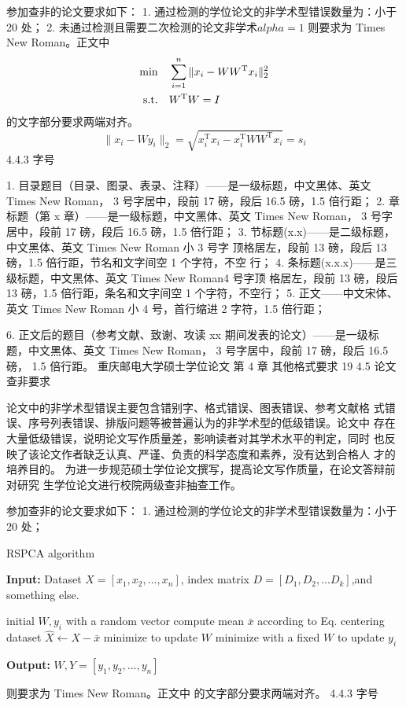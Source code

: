 \documentclass{CQUPTThesis}
\begin{document}
参加查非的论文要求如下：
1. 通过检测的学位论文的非学术型错误数量为：小于 20 处；
2. 未通过检测且需要二次检测的论文非学术$alpha=1$
则要求为 Times New Roman。正文中
\begin{align}
\min\quad&\sum_{i=1}^n\|x_i-WW^\mathrm{T}x_i\|_2^2\label{PCA}\\
\mbox{s.t.} \quad& W^\mathrm{T}W=I\notag
\end{align}
的文字部分要求两端对齐。
\begin{equation}
\|x_i-Wy_i\|_2=\sqrt{x_i^\mathrm{T}x_i-x_i^\mathrm{T}WW^\mathrm{T}x_i}=s_i
\end{equation}
4.4.3 字号

1. 目录题目（目录、图录、表录、注释）——是一级标题，中文黑体、英文
Times New Roman， 3 号字居中，段前 17 磅，段后 16.5 磅，1.5 倍行距；
2. 章标题（第 x 章）——是一级标题，中文黑体、英文 Times New Roman， 3
号字居中，段前 17 磅，段后 16.5 磅，1.5 倍行距；
3. 节标题(x.x)——是二级标题，中文黑体、英文 Times New Roman 小 3 号字
顶格居左，段前 13 磅，段后 13 磅，1.5 倍行距，节名和文字间空 1 个字符，不空
行；
4. 条标题(x.x.x)——是三级标题，中文黑体、英文 Times New Roman4 号字顶
格居左，段前 13 磅，段后 13 磅，1.5 倍行距，条名和文字间空 1 个字符，不空行；
5. 正文——中文宋体、英文 Times New Roman 小 4 号，首行缩进 2 字符，1.5
倍行距；


6. 正文后的题目（参考文献、致谢、攻读 xx 期间发表的论文）——是一级标
题，中文黑体、英文 Times New Roman， 3 号字居中，段前 17 磅，段后 16.5 磅，
1.5 倍行距。
重庆邮电大学硕士学位论文 第 4 章 其他格式要求
19
4.5 论文查非要求

论文中的非学术型错误主要包含错别字、格式错误、图表错误、参考文献格
式错误、序号列表错误、排版问题等被普遍认为的非学术型的低级错误。论文中
存在大量低级错误，说明论文写作质量差，影响读者对其学术水平的判定，同时
也反映了该论文作者缺乏认真、严谨、负责的科学态度和素养，没有达到合格人
才的培养目的。
为进一步规范硕士学位论文撰写，提高论文写作质量，在论文答辩前对研究
生学位论文进行校院两级查非抽查工作。

参加查非的论文要求如下：
1. 通过检测的学位论文的非学术型错误数量为：小于 20 处；
\begin{algorithm}
\linespread{1.0}\selectfont
\caption{RSPCA algorithm}
{\bf Input: }Dataset $X=[x_1,x_2,...,x_n]$, index matrix $D=[D_1,D_2,...D_k]$,and something else.
\label{alg1}
\begin{algorithmic}[1]
  \STATE initial $W,y_i$ with a random vector
  \STATE compute mean $\bar x$ according to Eq.
  \STATE centering dataset $\hat X \leftarrow X - \bar x$
  \STATE minimize  to update $W$
  \STATE minimize  with a fixed $W$ to update $y_i$
  \ENDWHILE 
\end{algorithmic}
{\bf Output:} $W,Y=[y_1,y_2,...,y_n]$
\end{algorithm}
则要求为 Times New Roman。正文中
的文字部分要求两端对齐。
4.4.3 字号
\end{document}
